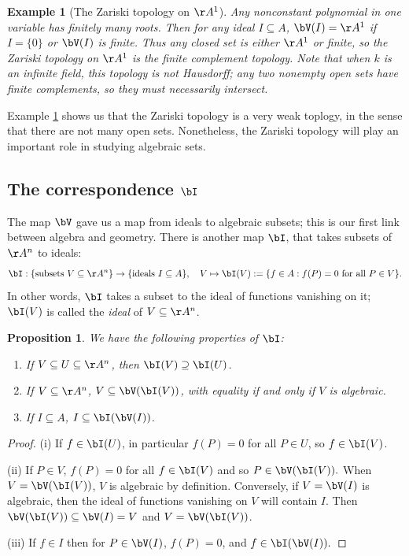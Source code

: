 \documentclass[12pt]{amsart}
\theoremstyle{plain}
\newtheorem{proposition}[theorem]{Proposition}
\newtheorem{example}[theorem]{Example}
\begin{document}
\begin{example}[The Zariski topology on $\AA^1$]\label{zariskia1}
Any nonconstant polynomial in one variable has finitely many roots.
Then for any ideal $I \subseteq A$, $\bV(I) = \AA^1$ if $I = \{0\}$ or $\bV(I)$ is finite.
Thus any closed set is either $\AA^1$ or finite, so the Zariski topology on $\AA^1$ is the finite complement topology.
Note that when $k$ is an infinite field, this topology is not Hausdorff; any two nonempty open sets have finite complements, so they must necessarily intersect.
\end{example}

Example \ref{zariskia1} shows us that the Zariski topology is a very weak toplogy, in the sense that there are not many open sets.
Nonetheless, the Zariski topology will play an important role in studying algebraic sets.

\subsection{The correspondence $\bI$}
The map $\bV$ gave us a map from ideals to algebraic subsets; this is our first link between algebra and geometry.
There is another map $\bI$, that takes subsets of $\AA^n$ to ideals:
$$\bI: \{\text{subsets } V \subseteq \AA^n\} \to \{\text{ideals } I \subseteq A\}, \quad V\mapsto \bI(V) := \{f \in A : f(P) = 0 \text{ for all } P \in V\}.$$
In other words, $\bI$ takes a subset to the ideal of functions vanishing on it; $\bI(V)$ is called the \emph{ideal} of $V \subseteq \AA^n$.

\begin{proposition}\label{iproperties}
We have the following properties of $\bI$:
\begin{enumerate}[\itshape(i)]
\item If $V \subseteq U \subseteq \AA^n$, then $\bI(V) \supseteq \bI(U)$.
\item If $V \subseteq \AA^n$, $V \subseteq \bV(\bI(V))$, with equality if and only if $V$ is algebraic.
\item If $I \subseteq A$, $I \subseteq \bI(\bV(I))$.
\end{enumerate}
\end{proposition}
\begin{proof}
(i) If $f \in \bI(U)$, in particular $f(P) = 0$ for all $P \in U$, so $f \in \bI(V)$.

(ii) If $P \in V$, $f(P) = 0$ for all $f \in \bI(V)$ and so $P \in \bV(\bI(V)).$
When $V = \bV(\bI(V))$, $V$ is algebraic by definition.
Conversely, if $V = \bV(I)$ is algebraic, then the ideal of functions vanishing on $V$ will contain $I$.
Then $\bV(\bI(V)) \subseteq \bV(I) = V$ and $V = \bV(\bI(V))$.

(iii) If $f \in I$ then for $P \in \bV(I)$, $f(P) = 0$, and $f \in \bI(\bV(I)).$
\end{proof}
\end{document}
